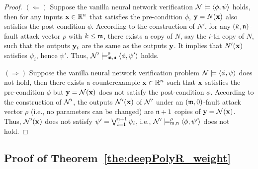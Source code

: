 \begin{proof}
$(\Leftarrow)$ Suppose the vanilla neural network verification ${\mathcal{N}}\models\langle \phi,\psi\rangle$ holds,
then for any inputs ${\mathbf{x}}\in \mathbb{R}^n$ that satisfies the pre-condition $\phi$, ${\mathbf{y}}=N({\mathbf{x}})$ also satisfies
the post-condition $\phi$. According to the construction of $N'$, 
for any $(k,\mathfrak{n})$-fault attack vector $\rho$ with $k\leq \mathfrak{m}$, 
there exists a copy of $N$, say
the $i$-th copy of $N$, such that the outputs ${\mathbf{y}}_i$ are the same as the outputs ${\mathbf{y}}$.
It implies that $N'({\mathbf{x}})$ satisfies $\psi_i$, hence $\psi'$.
Thus, ${\mathcal{N}}'\models^\rho_{\mathfrak{m},\mathfrak{n}}\langle \phi,\psi'\rangle$ holds.

$(\Rightarrow)$
Suppose the vanilla neural network verification problem ${\mathcal{N}}\models \langle \phi,\psi\rangle$ does not hold, then 
there exists a counterexample ${\mathbf{x}}\in \mathbb{R}^n$ such that
${\mathbf{x}}$ satisfies the pre-condition $\phi$ but ${\mathbf{y}}={\mathcal{N}}({\mathbf{x}})$ does not satisfy
the post-condition $\phi$. According to the construction of ${\mathcal{N}}'$, 
the outputs ${\mathcal{N}}'({\mathbf{x}})$ of ${\mathcal{N}}'$ under an $(\mathfrak{m},0)$-fault attack vector $\rho$ (i.e., no parameters can be changed)
are $\mathfrak{n}+1$ copies of ${\mathbf{y}}={\mathcal{N}}({\mathbf{x}})$.
Thus, ${\mathcal{N}}'({\mathbf{x}})$ does not satisfy $\psi'=\bigvee_{i=1}^{\mathfrak{n}+1}\psi_i$,
i.e., ${\mathcal{N}}'\models^\rho_{\mathfrak{m},\mathfrak{n}}\langle \phi,\psi'\rangle$ does not hold.
\end{proof}



\subsection{Proof of Theorem~\ref{the:deepPolyR_weight}}

